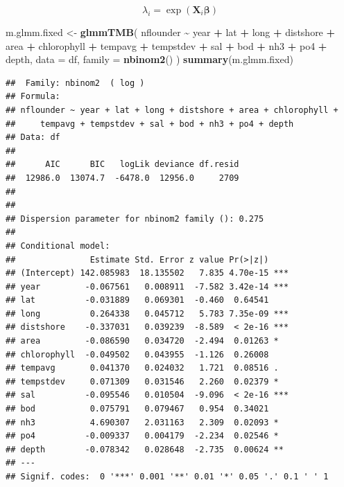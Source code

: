 \documentclass[
]{article}
\newenvironment{Shaded}{\begin{snugshade}}{\end{snugshade}}
\newcommand{\AttributeTok}[1]{\textcolor[rgb]{0.13,0.29,0.53}{#1}}
\newcommand{\FunctionTok}[1]{\textcolor[rgb]{0.13,0.29,0.53}{\textbf{#1}}}
\newcommand{\NormalTok}[1]{#1}
\newcommand{\OtherTok}[1]{\textcolor[rgb]{0.56,0.35,0.01}{#1}}
\newcommand{\SpecialCharTok}[1]{\textcolor[rgb]{0.81,0.36,0.00}{\textbf{#1}}}
\begin{document}
\[
\lambda_i = \exp(\mathbf{X}_i \boldsymbol{\beta})
\]

\begin{Shaded}
\begin{Highlighting}[]
\NormalTok{m.glmm.fixed }\OtherTok{\textless{}{-}} \FunctionTok{glmmTMB}\NormalTok{(}
\NormalTok{  nflounder }\SpecialCharTok{\textasciitilde{}}\NormalTok{ year }\SpecialCharTok{+}\NormalTok{ lat }\SpecialCharTok{+}\NormalTok{ long }\SpecialCharTok{+}\NormalTok{ distshore }\SpecialCharTok{+}\NormalTok{ area }\SpecialCharTok{+}\NormalTok{ chlorophyll }\SpecialCharTok{+}\NormalTok{ tempavg }\SpecialCharTok{+}\NormalTok{ tempstdev }\SpecialCharTok{+}\NormalTok{ sal }\SpecialCharTok{+}\NormalTok{ bod }\SpecialCharTok{+}\NormalTok{ nh3 }\SpecialCharTok{+}\NormalTok{ po4 }\SpecialCharTok{+}\NormalTok{ depth, }
  \AttributeTok{data =}\NormalTok{ df, }
  \AttributeTok{family =} \FunctionTok{nbinom2}\NormalTok{()}
\NormalTok{)}
\FunctionTok{summary}\NormalTok{(m.glmm.fixed)}
\end{Highlighting}
\end{Shaded}

\begin{verbatim}
##  Family: nbinom2  ( log )
## Formula:          
## nflounder ~ year + lat + long + distshore + area + chlorophyll +  
##     tempavg + tempstdev + sal + bod + nh3 + po4 + depth
## Data: df
## 
##      AIC      BIC   logLik deviance df.resid 
##  12986.0  13074.7  -6478.0  12956.0     2709 
## 
## 
## Dispersion parameter for nbinom2 family (): 0.275 
## 
## Conditional model:
##               Estimate Std. Error z value Pr(>|z|)    
## (Intercept) 142.085983  18.135502   7.835 4.70e-15 ***
## year         -0.067561   0.008911  -7.582 3.42e-14 ***
## lat          -0.031889   0.069301  -0.460  0.64541    
## long          0.264338   0.045712   5.783 7.35e-09 ***
## distshore    -0.337031   0.039239  -8.589  < 2e-16 ***
## area         -0.086590   0.034720  -2.494  0.01263 *  
## chlorophyll  -0.049502   0.043955  -1.126  0.26008    
## tempavg       0.041370   0.024032   1.721  0.08516 .  
## tempstdev     0.071309   0.031546   2.260  0.02379 *  
## sal          -0.095546   0.010504  -9.096  < 2e-16 ***
## bod           0.075791   0.079467   0.954  0.34021    
## nh3           4.690307   2.031163   2.309  0.02093 *  
## po4          -0.009337   0.004179  -2.234  0.02546 *  
## depth        -0.078342   0.028648  -2.735  0.00624 ** 
## ---
## Signif. codes:  0 '***' 0.001 '**' 0.01 '*' 0.05 '.' 0.1 ' ' 1
\end{verbatim}
\end{document}
